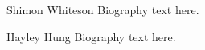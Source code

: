 \documentclass[10pt,journal,compsoc]{IEEEtran}
\begin{document}
\begin{IEEEbiography}{Shimon Whiteson}
Biography text here.
\end{IEEEbiography}

\begin{IEEEbiography}{Hayley Hung}
Biography text here.
\end{IEEEbiography}









\end{document}
